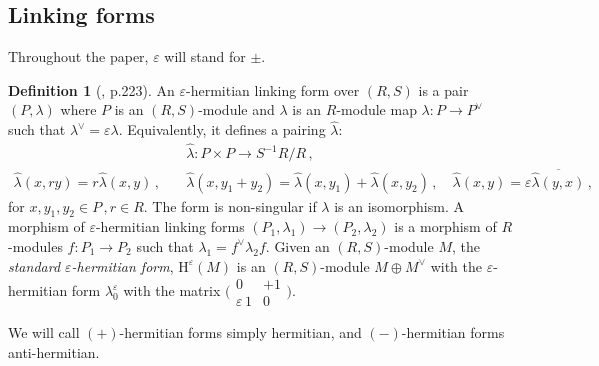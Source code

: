 \documentclass[sn-mathphys-num]{sn-jnl}
\theoremstyle{definition}
\newtheorem{definition}[lemma]{Definition}
\numberwithin{equation}{section}
\theoremstyle{definition}
\def\h{{\mbox{H}}}
\def\ep{\varepsilon}
\def\l{{\lambda}}
\def\hl{{\hat \lambda}}
\begin{document}
\subsection{Linking forms}
Throughout the paper, $\ep$ will stand for $\pm$. 

\begin{definition}[\cite{Ranicki1981ExactSI}, p.223]
    An $\ep$-hermitian linking form over $(R,S)$ is a pair $(P,\lambda)$ where $P$ is an $(R,S)$-module and $\l$ is an $R$-module map $\l:P\to P^{\vee}$ such that $\l^{\vee}=\ep \l$. Equivalently, it defines a pairing $\hat \l$:
\begin{align}
       &\hl: P\times P\rightarrow S^{-1}R/R\,,\nonumber\\
       \hl(x,ry)=r\hl(x,y)\,,\quad &\hl(x,y_1+y_2)=\hl(x,y_1)+\hl(x,y_2)\,,\quad \hl (x,y)=\ep\overline{\hl(y,x)}\,,
\end{align}
for $x,y_1,y_2\in P\,,r\in R$. The form is non-singular if $\l$ is an isomorphism. 
A morphism of $\ep$-hermitian linking forms $(P_1,\l_1)\to(P_2,\l_2)$ is a morphism  of $R$-modules $f:P_1\to P_2$ such that $\l_1=f^{\vee}\l_2f$. Given an $(R,S)$-module $M$, the \textit{standard $\ep$-hermitian form}, $\h^{\ep}(M)$ is an $(R,S)$-module $M\oplus M^{\vee}$ with the $\ep$-hermitian form $\l^{\ep}_0$ with the matrix $\big(\begin{smallmatrix}
    0 & +1\\
    \ep\,1 & 0
\end{smallmatrix}\big)$.
\end{definition} 
We will call $(+)$-hermitian forms simply hermitian, and $(-)$-hermitian forms anti-hermitian. 
\end{document}
